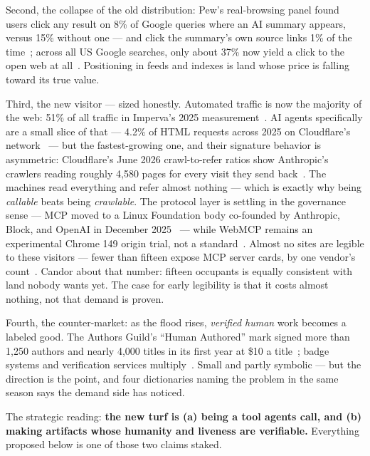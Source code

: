 \documentclass[10pt,letterpaper,twocolumn]{article}
\begin{document}
Second, the collapse of the old distribution: Pew's real-browsing panel found users click any result on 8\% of Google queries where an AI summary appears, versus 15\% without one --- and click the summary's own source links 1\% of the time~\citep{pew2025aioverviews}; across all US Google searches, only about 37\% now yield a click to the open web at all~\citep{sparktoro2024zeroclick}. Positioning in feeds and indexes is land whose price is falling toward its true value.

Third, the new visitor --- sized honestly. Automated traffic is now the majority of the web: 51\% of all traffic in Imperva's 2025 measurement~\citep{thales2025badbot}. AI agents specifically are a small slice of that --- 4.2\% of HTML requests across 2025 on Cloudflare's network~\citep{cloudflare2025yir} --- but the fastest-growing one, and their signature behavior is asymmetric: Cloudflare's June 2026 crawl-to-refer ratios show Anthropic's crawlers reading roughly 4{,}580 pages for every visit they send back~\citep{cloudflare2026crawlrefer}. The machines read everything and refer almost nothing --- which is exactly why being \emph{callable} beats being \emph{crawlable}. The protocol layer is settling in the governance sense --- MCP moved to a Linux Foundation body co-founded by Anthropic, Block, and OpenAI in December 2025~\citep{anthropic2024mcp,anthropic2025aaif} --- while WebMCP remains an experimental Chrome 149 origin trial, not a standard~\citep{chrome2026webmcp}. Almost no sites are legible to these visitors --- fewer than fifteen expose MCP server cards, by one vendor's count~\citep{discoveredlabs2026webmcp}. Candor about that number: fifteen occupants is equally consistent with land nobody wants yet. The case for early legibility is that it costs almost nothing, not that demand is proven.

Fourth, the counter-market: as the flood rises, \emph{verified human} work becomes a labeled good. The Authors Guild's ``Human Authored'' mark signed more than 1{,}250 authors and nearly 4{,}000 titles in its first year at \$10 a title~\citep{authorsguild2026humanauthored,npr2026cert}; badge systems and verification services multiply~\citep{notbyai2026,edtech2026verify}. Small and partly symbolic --- but the direction is the point, and four dictionaries naming the problem in the same season says the demand side has noticed.

The strategic reading: \textbf{the new turf is (a) being a tool agents call, and (b) making artifacts whose humanity and liveness are verifiable.} Everything proposed below is one of those two claims staked.
\end{document}
